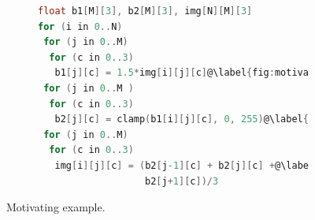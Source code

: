 \begin{figure}[ht]
\begin{subfigure}{.1\textwidth}
\end{subfigure}
\hspace*{\fill}
\begin{subfigure}{.35\textwidth}
 \begin{lstlisting}[language=C,escapechar=@]
float b1[M][3], b2[M][3], img[N][M][3]
for (i in 0..N)
 for (j in 0..M)
  for (c in 0..3)
   b1[j][c] = 1.5*img[i][j][c]@\label{fig:motivating:code1:stmt1}@
 for (j in 0..M )
  for (c in 0..3)
   b2[j][c] = clamp(b1[i][j][c], 0, 255)@\label{fig:motivating:code1:stmt2}@
 for (j in 0..M)
  for (c in 0..3)
   img[i][j][c] = (b2[j-1][c] + b2[j][c] +@\label{fig:motivating:code1:stmt3}@
                   b2[j+1][c])/3
\end{lstlisting}
\end{subfigure}
\caption{\label{fig:motivating:example} Motivating example.}
\end{figure}



